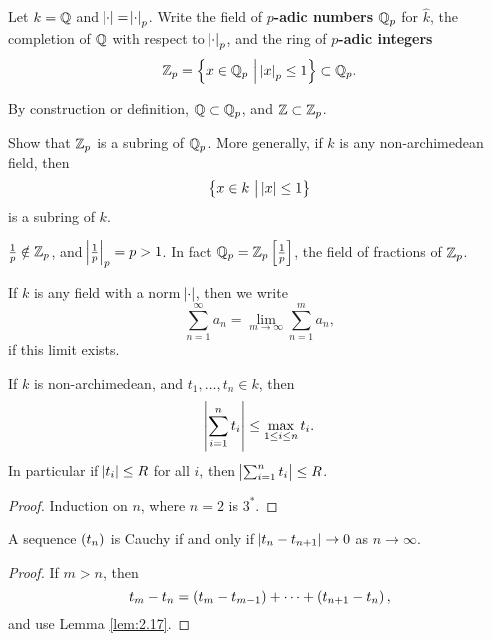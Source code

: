\begin{definition}
Let $ k = \mathbb{Q} $ and $ \abs{\cdot} = \abs{\cdot}_p $. Write the field of \textbf{$ p $-adic numbers} $ \mathbb{Q}_p $ for $ \widehat{k} $, the completion of $ \mathbb{Q} $ with respect to $ \abs{\cdot}_p $, and the ring of \textbf{$ p $-adic integers}
$$ \ZZ_p = \cbr{x \in \QQ_p \st \abs{x}_p \le 1} \subset \QQ_p. $$
\end{definition}

By construction or definition, $ \mathbb{Q} \subset \mathbb{Q}_p $, and $ \mathbb{Z} \subset \mathbb{Z}_p $.

\begin{exercise}
Show that $ \mathbb{Z}_p $ is a subring of $ \mathbb{Q}_p $. More generally, if $ k $ is any non-archimedean field, then
$$ \cbr{x \in k \st \abs{x} \le 1} $$
is a subring of $ k $.
\end{exercise}

\begin{note*}
$ \tfrac{1}{p} \notin \mathbb{Z}_p $, and $ \abs{\tfrac{1}{p}}_p = p > 1 $. In fact $ \QQ_p = \ZZ_p\sbr{\tfrac{1}{p}} $, the field of fractions of $ \mathbb{Z}_p $.
\end{note*}

\begin{definition}
If $ k $ is any field with a norm $ \abs{\cdot} $, then we write
$$ \sum_{n = 1}^\infty a_n = \lim_{m \to \infty} \sum_{n = 1}^m a_n, $$
if this limit exists.
\end{definition}

\begin{lemma}
\label{lem:2.17}
If $ k $ is non-archimedean, and $ t_1, \dots, t_n \in k $, then
$$ \abs{\sum_{i = 1}^n t_i} \le \max_{1 \le i \le n} t_i. $$
In particular if $ \abs{t_i} \le R $ for all $ i $, then $ \abs{\sum_{i = 1}^n t_i} \le R $.
\end{lemma}

\begin{proof}
Induction on $ n $, where $ n = 2 $ is $ 3^* $.
\end{proof}

\begin{corollary}
\label{cor:2.18}
A sequence $ \br{t_n} $ is Cauchy if and only if $ \abs{t_n - t_{n + 1}} \to 0 $ as $ n \to \infty $.
\end{corollary}

\begin{proof}
If $ m > n $, then
$$ t_m - t_n = \br{t_m - t_{m - 1}} + \dots + \br{t_{n + 1} - t_n}, $$
and use Lemma \ref{lem:2.17}.
\end{proof}

